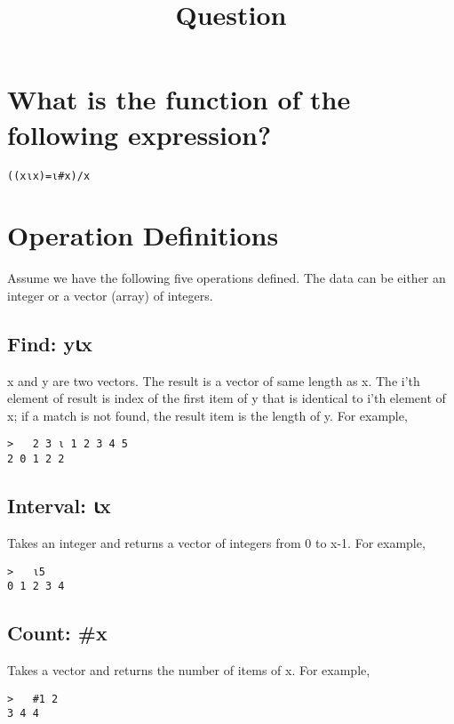 \documentclass[a4paper]{article}
\title{Question}
\date{}
\begin{document}
\maketitle

\section{What is the function of the following expression?}

\begin{verbatim}
((x⍳x)=⍳#x)/x
\end{verbatim}

\section{Operation Definitions}

Assume we have the following five operations defined. The data can be
either an integer or a vector (array) of integers.

\subsection{Find: y⍳x}

x and y are two vectors. The result is a vector of same length as
 x. The i'th element of result is index of the first item of y that is
 identical to i'th element of x; if a match is not found, the result
 item is the length of y. For example,

\begin{verbatim}
>   2 3 ⍳ 1 2 3 4 5
2 0 1 2 2
\end{verbatim}

\subsection{Interval: ⍳x}

Takes an integer and returns a vector of integers from 0 to
 x-1. For example,

\begin{verbatim}
>   ⍳5
0 1 2 3 4
\end{verbatim}

\subsection{Count: \#x}

Takes a vector and returns the number of items of x. For example,
\begin{verbatim}
>   #1 2
3 4 4
\end{verbatim}
\end{document}
